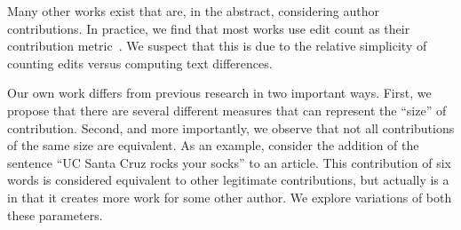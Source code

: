 Many other works exist that are, in the abstract, considering
author contributions.  In practice, we find that most works
use edit count as their contribution
metric~\cite{Wilkinson2007,Burke2008,Suh2008,Ortega2007,Stein2007}.
We suspect that this is due to the relative simplicity of
counting edits versus computing text differences.

Our own work differs from previous research in two important ways.
First, we propose that there are several different measures that
can represent the ``size'' of contribution.
Second, and more importantly, we observe that not all
contributions of the same size are equivalent.
As an example, consider the addition of the sentence ``UC Santa
Cruz rocks your socks'' to an article.
This contribution of six words is considered equivalent to other
legitimate contributions, but actually is a 
in that it creates more work for some other author.
We explore variations of both these parameters.

